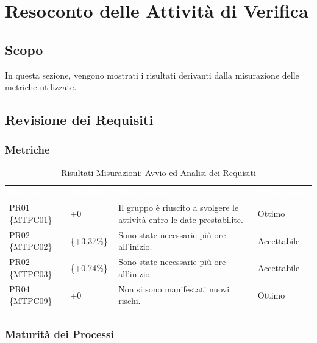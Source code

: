 \section{Resoconto delle Attività di Verifica}\label{Resoconto}
\subsection{Scopo}

In questa sezione, vengono mostrati i risultati derivanti dalla misurazione delle metriche utilizzate.

\subsection{Revisione dei Requisiti}


\subsubsection{Metriche}

\begin{longtable}{|C{.16\textwidth}|C{.16\textwidth}|C{.36\textwidth}|C{.20\textwidth}|}
\hline
{}\textbf{\textcolor{white}{Processo}} & \textbf{\textcolor{white}{Risultato}} & \textbf{\textcolor{white}{Descrizione}} & \textbf{\textcolor{white}{Valutazione}}\\
PR01 \{MTPC01\} & +0 & Il gruppo è riuscito a svolgere le attività entro le date prestabilite. & Ottimo \\
\hline

PR02 \{MTPC02\} &  \{+3.37\%\} & Sono state necessarie più ore all'inizio. & Accettabile\\
\hline

PR02 \{MTPC03\} &  \{+0.74\%\} & Sono state necessarie più ore all'inizio. & Accettabile\\
\hline

PR04 \{MTPC09\} & +0 & Non si sono manifestati nuovi rischi. & Ottimo\\
\hline

\caption{Risultati Misurazioni: Avvio ed Analisi dei Requisiti}
\label{ris:aar}
\end{longtable}

\subsubsection{Maturità dei Processi}

